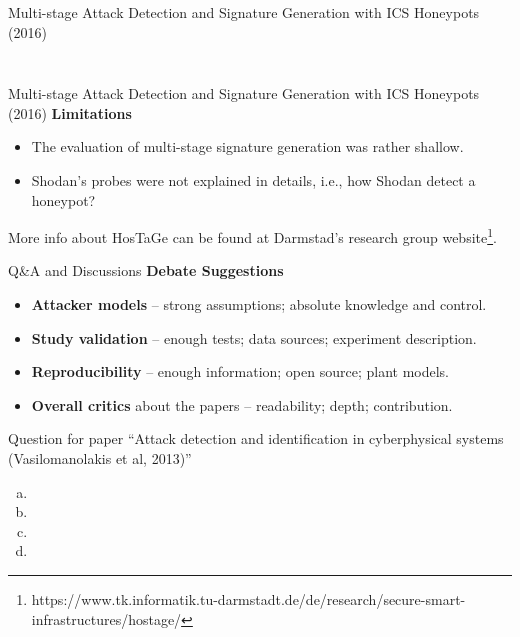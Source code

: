 \documentclass[compress]{beamer}
\begin{document}
\begin{frame}{Multi-stage Attack Detection and Signature Generation with ICS Honeypots (2016)}
\begin{columns}
\begin{column}{0.45\textwidth}
\begin{figure}
      \label{fig:hostage-ip-sources}
      \end{figure}
     \end{column}
    \end{columns}
\end{frame}
\begin{frame}{Multi-stage Attack Detection and Signature Generation with ICS Honeypots (2016)}
    \textbf{Limitations}
    \begin{itemize}
     \item The evaluation of multi-stage signature generation was rather shallow.
     \item Shodan's probes were not explained in details, i.e., how Shodan detect a honeypot?
    \end{itemize}
    More info about HosTaGe can be found at Darmstad's research group website\footnote{https://www.tk.informatik.tu-darmstadt.de/de/research/secure-smart-infrastructures/hostage/}.
\end{frame}

\begin{frame}{Q\&A and Discussions}
      \textbf{Debate Suggestions}
      \begin{itemize}
       \item \textbf{Attacker models} \cite{pasqualetti2013attack,genge2015system} -- strong assumptions; absolute knowledge and control.
       \item \textbf{Study validation} -- enough tests; data sources; experiment description.
       \item \textbf{Reproducibility} -- enough information; open source; plant models.
       \item \textbf{Overall critics} about the papers -- readability; depth; contribution.
      \end{itemize}

\end{frame}

\begin{frame}{Question for paper ``Attack detection and identification in cyberphysical systems (Vasilomanolakis et al, 2013)''}
      \textbf{}
      \begin{enumerate}[(a)]
       \item 
       \item 
       \item 
       \item 
      \end{enumerate}
\end{frame}
\end{document}
